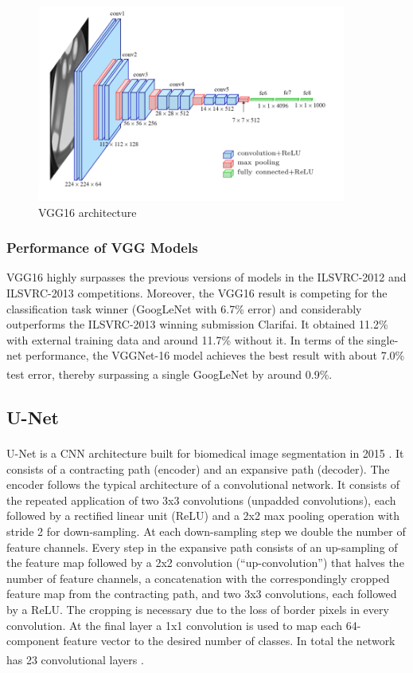 \begin{figure}[h]
\centering
    \centerline{\includegraphics[width = 4in]{../images/VGG16-architecture.png}}
    \caption{VGG16 architecture}
\end{figure}

\subsubsection{Performance of VGG Models}
\hspace{\parindent}
VGG16 highly surpasses the previous versions of models in the ILSVRC-2012 and ILSVRC-2013 competitions. Moreover, the VGG16 result is competing for the classification task winner (GoogLeNet with 6.7\% error) and considerably outperforms the ILSVRC-2013 winning submission Clarifai. It obtained 11.2\% with external training data and around 11.7\% without it. In terms of the single-net performance, the VGGNet-16 model achieves the best result with about 7.0\% test error, thereby surpassing a single GoogLeNet by around 0.9\%. \textsuperscript{\cite{VGG-Gaudenz_Boesch}}

\subsection{U-Net}
U-Net is a CNN architecture built for biomedical image segmentation in 2015 \textsuperscript{\cite{ronneberger2015u}}. It consists of a contracting path (encoder) and an expansive path (decoder). The encoder follows the typical architecture of a convolutional network. It consists of the repeated application of two 3x3 convolutions (unpadded convolutions), each followed by a rectified linear unit (ReLU) and a 2x2 max pooling operation with stride 2 for down-sampling. At each down-sampling step we double the number of feature channels. Every step in the expansive path consists of an up-sampling of the feature map followed by a 2x2 convolution (“up-convolution”) that halves the number of feature channels, a concatenation with the correspondingly cropped feature map from the contracting path, and two 3x3 convolutions, each followed by a ReLU. The cropping is necessary due to the loss of border pixels in every convolution. At the final layer a 1x1 convolution is used to map each 64-component feature vector to the desired number of classes. In total the network has 23 convolutional layers \textsuperscript{\cite{paperswithcode-U-Net}}.

